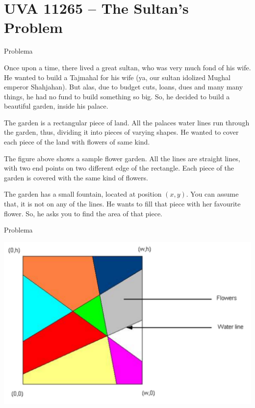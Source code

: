 \section{UVA 11265 -- The Sultan's Problem}

\begin{frame}[fragile]{Problema}

Once upon a time, there lived a great sultan, who was very much fond of his wife. He wanted to build
a Tajmahal for his wife (ya, our sultan idolized Mughal emperor Shahjahan). But alas, due to budget
cuts, loans, dues and many many things, he had no fund to build something so big. So, he decided to
build a beautiful garden, inside his palace.

The garden is a rectangular piece of land. All the palaces water lines run through the garden, thus,
dividing it into pieces of varying shapes. He wanted to cover each piece of the land with flowers of same
kind.

The figure above shows a sample flower garden. All the lines are straight lines, with two end points
on two different edge of the rectangle. Each piece of the garden is covered with the same kind of flowers.

The garden has a small fountain, located at position $(x, y)$. You can assume that, it is not on any
of the lines. He wants to fill that piece with her favourite flower. So, he asks you to find the area of
that piece.

\end{frame}

\begin{frame}[fragile]{Problema}

\begin{center}
\includegraphics[scale=0.7]{figure.png}
\end{center}

\end{frame}


